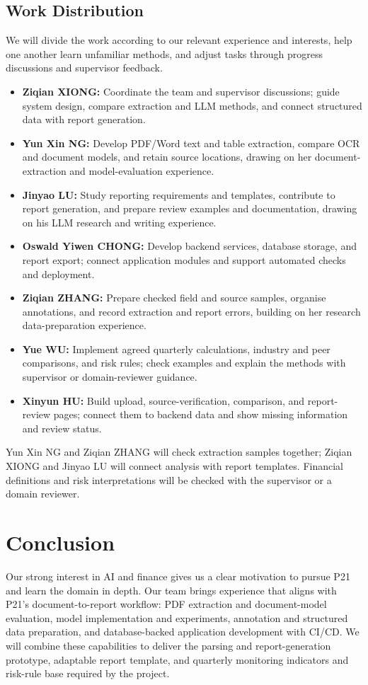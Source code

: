 \documentclass[a4paper,12pt]{article}
\begin{document}
\subsection{Work Distribution}
We will divide the work according to our relevant experience and interests, help one another learn unfamiliar methods, and adjust tasks through progress discussions and supervisor feedback.
\begin{itemize}
  \item \textbf{Ziqian XIONG:} Coordinate the team and supervisor discussions; guide system design, compare extraction and LLM methods, and connect structured data with report generation.
  \item \textbf{Yun Xin NG:} Develop PDF/Word text and table extraction, compare OCR and document models, and retain source locations, drawing on her document-extraction and model-evaluation experience.
  \item \textbf{Jinyao LU:} Study reporting requirements and templates, contribute to report generation, and prepare review examples and documentation, drawing on his LLM research and writing experience.
  \item \textbf{Oswald Yiwen CHONG:} Develop backend services, database storage, and report export; connect application modules and support automated checks and deployment.
  \item \textbf{Ziqian ZHANG:} Prepare checked field and source samples, organise annotations, and record extraction and report errors, building on her research data-preparation experience.
  \item \textbf{Yue WU:} Implement agreed quarterly calculations, industry and peer comparisons, and risk rules; check examples and explain the methods with supervisor or domain-reviewer guidance.
  \item \textbf{Xinyun HU:} Build upload, source-verification, comparison, and report-review pages; connect them to backend data and show missing information and review status.
\end{itemize}

Yun Xin NG and Ziqian ZHANG will check extraction samples together; Ziqian XIONG and Jinyao LU will connect analysis with report templates. Financial definitions and risk interpretations will be checked with the supervisor or a domain reviewer.

\clearpage
\section{Conclusion}
Our strong interest in AI and finance gives us a clear motivation to pursue P21 and learn the domain in depth. Our team brings experience that aligns with P21's document-to-report workflow: PDF extraction and document-model evaluation, model implementation and experiments, annotation and structured data preparation, and database-backed application development with CI/CD. We will combine these capabilities to deliver the parsing and report-generation prototype, adaptable report template, and quarterly monitoring indicators and risk-rule base required by the project.
\end{document}
